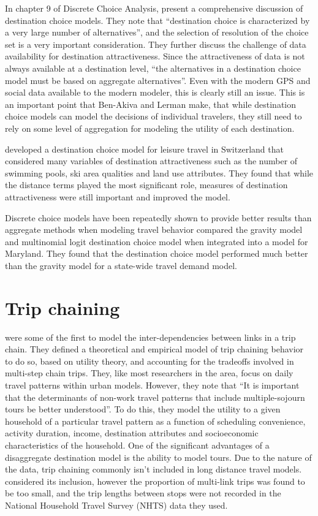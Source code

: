 In chapter 9 of Discrete Choice Analysis, \textcite{AkivaLerman85} present a comprehensive discussion of destination choice models. They note that \enquote{destination choice is characterized by a very large number of alternatives}, and the selection of resolution of the choice set is a very important consideration. They further discuss the challenge of data availability for destination attractiveness. Since the attractiveness of data is not always available at a destination level, \enquote{the alternatives in a destination choice model must be based on aggregate alternatives}. Even with the modern GPS and social data available to the modern modeler, this is clearly still an issue. This is an important point that Ben-Akiva and Lerman make, that while destination choice models can model the decisions of individual travelers, they still need to rely on some level of aggregation for modeling the utility of each destination.

\textcite{simma2001destination} developed a destination choice model for leisure travel in Switzerland that considered many variables of destination attractiveness such as the number of swimming pools, ski area qualities and land use attributes. They found that while the distance terms played the most significant role, measures of destination attractiveness were still important and improved the model. 

Discrete choice models have been repeatedly shown to provide better results than aggregate methods when modeling travel behavior \parencite{Stephanedes84, Mishra13} compared the gravity model and multinomial logit destination choice model when integrated into a model for Maryland. They found that the destination choice model performed much better than the gravity model for a state-wide travel demand model. 

\section{Trip chaining}
\textcite{AdlerAkiva79} were some of the first to model the inter-dependencies between links in a trip chain. They defined a theoretical and empirical model of trip chaining behavior to do so, based on utility theory, and accounting for the tradeoffs involved in multi-step chain trips. They, like most researchers in the area, focus on daily travel patterns within urban models. However, they note that \enquote{It is important that the determinants of non-work travel patterns that include multiple-sojourn tours be better understood}. To do this, they model the utility to a given household of a particular travel pattern as a function of scheduling convenience, activity duration, income, destination attributes and socioeconomic characteristics of the household.
One of the significant advantages of a disaggregate destination model is the ability to model tours. Due to the nature of the data, trip chaining commonly isn't included in long distance travel models. \textcite{Moeckel15} considered its inclusion, however the proportion of multi-link trips was found to be too small, and the trip lengths between stops were not recorded in the National Household Travel Survey (NHTS) data they used. 

